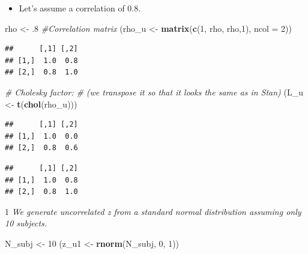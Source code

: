 \documentclass[12pt,]{krantz}
\newenvironment{Shaded}{\begin{snugshade}}{\end{snugshade}}
\newcommand{\CommentTok}[1]{\textcolor[rgb]{0.56,0.35,0.01}{\textit{#1}}}
\newcommand{\DataTypeTok}[1]{\textcolor[rgb]{0.13,0.29,0.53}{#1}}
\newcommand{\DecValTok}[1]{\textcolor[rgb]{0.00,0.00,0.81}{#1}}
\newcommand{\FloatTok}[1]{\textcolor[rgb]{0.00,0.00,0.81}{#1}}
\newcommand{\KeywordTok}[1]{\textcolor[rgb]{0.13,0.29,0.53}{\textbf{#1}}}
\newcommand{\NormalTok}[1]{#1}
\newcommand{\OperatorTok}[1]{\textcolor[rgb]{0.81,0.36,0.00}{\textbf{#1}}}
\newcommand{\StringTok}[1]{\textcolor[rgb]{0.31,0.60,0.02}{#1}}
\providecommand{\tightlist}{%
  \setlength{\itemsep}{0pt}\setlength{\parskip}{0pt}}
\theoremstyle{definition}
\theoremstyle{definition}
\theoremstyle{definition}
\theoremstyle{remark}
\begin{document}
\begin{itemize}
\tightlist
\item
  Let's assume a correlation of \(0.8\).
\end{itemize}

\begin{Shaded}
\begin{Highlighting}[]
\NormalTok{rho <-}\StringTok{ }\FloatTok{.8}
\CommentTok{#Correlation matrix}
\NormalTok{(rho_u <-}\StringTok{ }\KeywordTok{matrix}\NormalTok{(}\KeywordTok{c}\NormalTok{(}\DecValTok{1}\NormalTok{, rho, rho,}\DecValTok{1}\NormalTok{), }\DataTypeTok{ncol =} \DecValTok{2}\NormalTok{))}
\end{Highlighting}
\end{Shaded}

\begin{verbatim}
##      [,1] [,2]
## [1,]  1.0  0.8
## [2,]  0.8  1.0
\end{verbatim}

\begin{Shaded}
\begin{Highlighting}[]
\CommentTok{# Cholesky factor:}
\CommentTok{# (we transpose it so that it looks the same as in Stan)}
\NormalTok{(L_u <-}\StringTok{ }\KeywordTok{t}\NormalTok{(}\KeywordTok{chol}\NormalTok{(rho_u))) }
\end{Highlighting}
\end{Shaded}

\begin{verbatim}
##      [,1] [,2]
## [1,]  1.0  0.0
## [2,]  0.8  0.6
\end{verbatim}

\begin{Shaded}
\end{Shaded}

\begin{verbatim}
##      [,1] [,2]
## [1,]  1.0  0.8
## [2,]  0.8  1.0
\end{verbatim}

1 \emph{We generate uncorrelated z from a standard normal distribution assuming only 10 subjects.}

\begin{Shaded}
\begin{Highlighting}[]
\NormalTok{ N_subj <-}\StringTok{ }\DecValTok{10}
\NormalTok{ (z_u1 <-}\StringTok{ }\KeywordTok{rnorm}\NormalTok{(N_subj, }\DecValTok{0}\NormalTok{, }\DecValTok{1}\NormalTok{))}
\end{Highlighting}
\end{Shaded}
\end{document}
